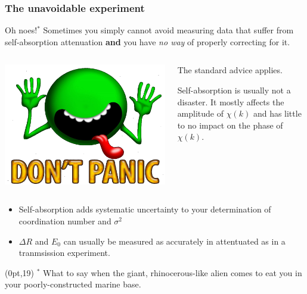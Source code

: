 \documentclass[10pt, xcolor=x11names, compress, handout]{beamer}
\begin{document}
\begin{frame}
  \frametitle{The unavoidable experiment}

  \begin{alertblock}{Oh noes!$^*$}
    Sometimes you simply cannot avoid measuring data that suffer from
    self-absorption attenuation \textbf{and} you have \textit{no way}
    of properly correcting for it.
  \end{alertblock}
  \begin{columns}
    \begin{column}{0.25\linewidth}
      \includegraphics[width=\linewidth]{images/DontPanic.png}      
    \end{column}
    \begin{column}{0.75\linewidth}
      The standard advice applies.
      
      \medskip

      Self-absorption  is usually not a disaster.  It mostly affects
      the amplitude of $\chi(k)$ and has little to no impact on the
      phase of  $\chi(k)$.
    \end{column}
  \end{columns}

  \bigskip

  \begin{itemize}
  \item Self-absorption adds systematic uncertainty to your
    determination of coordination number and $\sigma^2$
  \item $\Delta R$ and $E_0$ can usually be measured as accurately in
    attentuated as in a tranmsission experiment.
  \end{itemize}

  \begin{textblock*}{0.5\linewidth}(0pt,19\TPVertModule)
    \tiny%
    $^*$ What to say when the giant, rhinocerous-like alien comes to eat
    you in your poorly-constructed marine base.

  \end{textblock*}
\end{frame}
\end{document}
